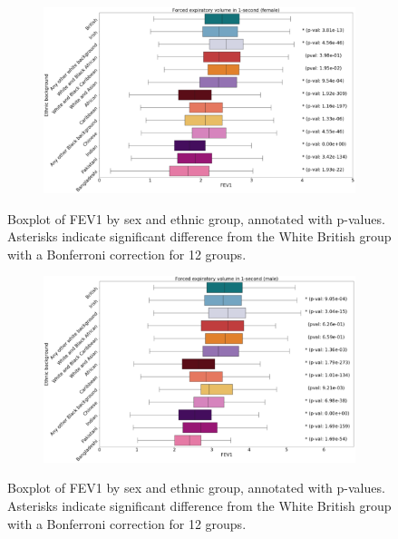 \documentclass[12pt]{pnas-new}
\begin{document}
\begin{figure}
    \centering
    \begin{subfigure}{\textwidth}
    \includegraphics[width=\textwidth]{images/female_fev_boxplot_annotated.pdf}
    \end{subfigure}
    \caption{Boxplot of FEV1 by sex and ethnic group, annotated with p-values. Asterisks indicate significant difference from the White British group with a Bonferroni correction for 12 groups.}
    \label{fig:supp_box_fev_f}
\end{figure}

\begin{figure}
    \centering
    \begin{subfigure}{\textwidth}
    \includegraphics[width=\textwidth]{images/male_fev_boxplot_annotated.pdf}
    \end{subfigure}
    \caption{Boxplot of FEV1 by sex and ethnic group, annotated with p-values. Asterisks indicate significant difference from the White British group with a Bonferroni correction for 12 groups.}
    \label{fig:supp_box_fev_m}
\end{figure}
\end{document}
